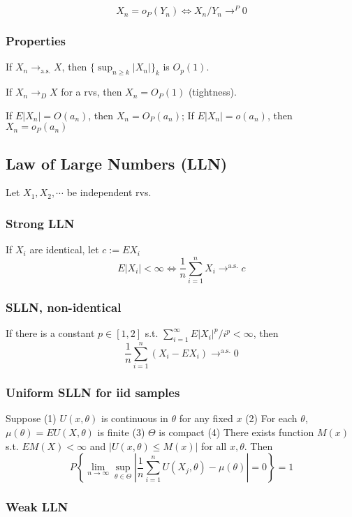 $$
X_n = o_P(Y_n) \Leftrightarrow X_n/Y_n \rightarrow^P 0
$$

\subsubsection{Properties}

If $X_n\rightarrow_{\text{a.s.}}X$, then $\{\sup_{n\geq k} |X_n|\}_k$ is $O_p(1)$.

If $X_n\rightarrow_D X$ for a rvs, then $X_n = O_P(1)$ (tightness).

If $E|X_n| = O(a_n)$, then $X_n=O_P(a_n)$; If $E|X_n|=o(a_n)$, then $X_n=o_P(a_n)$

\subsection{Law of Large Numbers (LLN)}

Let $X_1, X_2, \cdots$ be independent rvs.

\subsubsection{Strong LLN} If $X_i$ are identical, let $c:= EX_i$
$$E|X_i|<\infty\Leftrightarrow \frac{1}{n}\sum_{i=1}^n X_i \rightarrow^{\text{a.s.}} c$$

\subsubsection{SLLN, non-identical}

If there is a constant $p\in[1, 2]$ s.t. $\sum_{i=1}^\infty E|X_i|^p/i^p<\infty$, then
$$
\frac{1}{n}\sum_{i=1}^n (X_i-EX_i)\rightarrow^{\text{a.s.}} 0
$$

\subsubsection{Uniform SLLN for iid samples}
Suppose (1) $U(x, \theta)$ is continuous in $\theta$ for any fixed $x$ (2) For each $\theta$, $\mu(\theta)=EU(X, \theta)$ is finite (3) $\Theta$ is compact (4) There exists function $M(x)$ s.t. $EM(X) < \infty$ and $|U(x, \theta)\leq M(x)|$ for all $x, \theta$. Then
$$
P\left\{
    \lim_{n\rightarrow\infty}\sup_{\theta\in\Theta} \left|
        \frac{1}{n}\sum_{i=1}^n U(X_j, \theta)-\mu(\theta)
    \right| = 0
\right\} = 1
$$

\subsubsection{Weak LLN}

